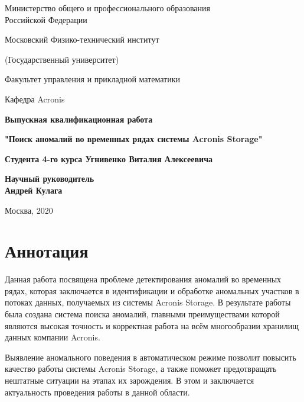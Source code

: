 \documentclass[14pt, a4paper]{extarticle}
\newcommand{\anonsection}[1]{\section*{#1}\addcontentsline{toc}{section}{#1}}
\begin{document}
	
	\vskip 3mm
	
	\setcounter{page}{1}
	\begin{center}
		\thispagestyle{empty}
		
		{ Министерство общего и профессионального образования \\}
		{ Российской Федерации \\}
		
		
		
		{ Московский Физико-технический институт \\}
		
		{(Государственный университет) \\}
		
		{ Факультет управления и прикладной математики \\}
		
		{ Кафедра Acronis \\[4cm]}
		
		{ \bf \Large Выпускная квалификационная работа\\}
		
		{ \bf \Large{"Поиск аномалий во временных рядах системы Acronis Storage"\\[1cm]} }
		
		{\bf {Студента 4-го курса Угнивенко Виталия Алексеевича}\\[3cm]}
		
	\end{center}
	
	\begin{flushright}
		\bf{Научный руководитель}\\
		\bf{Андрей Кулага}\\[4cm]
	\end{flushright}
	
	\begin{center}
		Москва, 2020
	\end{center}
	
	\newpage
	\anonsection{Аннотация}
	
	Данная работа посвящена проблеме детектирования аномалий во    временных рядах, которая заключается в идентификации и обработке аномальных участков в потоках данных, получаемых из системы Acronis Storage. В результате работы была создана система поиска аномалий, главными преимуществами которой являются высокая точность и корректная работа на всём многообразии хранилищ данных компании Acronis.
	
	Выявление аномального поведения в автоматическом режиме позволит повысить  качество работы системы Acronis Storage, а также поможет предотвращать нештатные ситуации на этапах их зарождения. В этом и заключается актуальность проведения работы в данной области.
	
\end{document}
